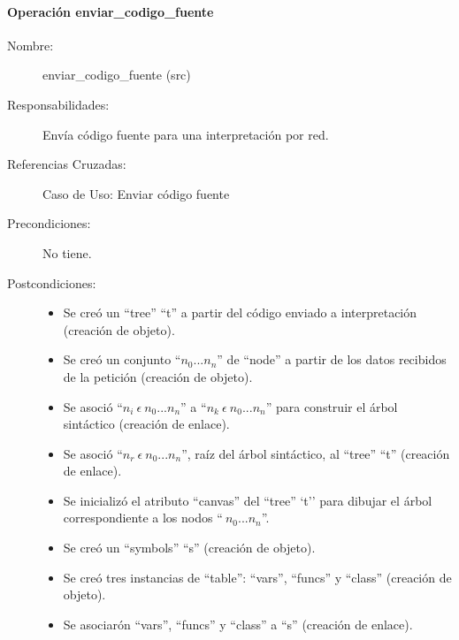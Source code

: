 \paragraph{Operación enviar\_codigo\_fuente}
\FloatBarrier
\begin{framed}
	\begin{description}
		\item [Nombre:] enviar\_codigo\_fuente (src)
		\item [Responsabilidades:] Envía código fuente para una interpretación por red.
		\item [Referencias Cruzadas: ] Caso de Uso: Enviar código fuente
      \item [Precondiciones:] No tiene.
      \item [Postcondiciones:] \hfill
      \begin {itemize}
         \item Se creó un ``tree'' ``t'' a partir del código enviado a interpretación (creación de objeto).
         \item Se creó un conjunto ``$n_0...n_n$'' de ``node'' a partir de los datos recibidos de la petición (creación de objeto).
         \item Se asoció ``$n_i\ \epsilon\ n_0...n_n$'' a ``$n_k\ \epsilon\ n_0...n_n$'' para construir el árbol sintáctico (creación de enlace).
         \item Se asoció  ``$n_r\ \epsilon\ n_0...n_n$'', raíz del árbol sintáctico, al ``tree'' ``t'' (creación de enlace).
         \item Se inicializó el atributo ``canvas'' del ``tree'' `t'' para dibujar el árbol correspondiente a los nodos ``$\ n_0...n_n$''.
         \item Se creó un ``symbols'' ``s'' (creación de objeto).
         \item Se creó tres instancias de ``table'': ``vars'', ``funcs'' y ``class'' (creación de objeto).
         \item Se asociarón ``vars'', ``funcs'' y ``class'' a ``s'' (creación de enlace).
      \end{itemize}
	\end{description}
\end{framed}
\FloatBarrier

